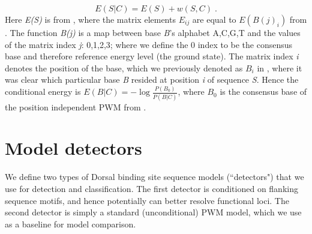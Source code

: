 \begin{equation}\label{cepwm}
  E(S|C) = E(S) + w(S,C)\;.
  \end{equation}
  Here \textit{E(S)} is from , where the matrix elements $E_{ij}$ are equal to $E(B(j)_i)$ from .  The function \textit{B(j)} is a map between base \textit{B}'s alphabet A,C,G,T and the values of the matrix index \textit{j}: 0,1,2,3; where we define the 0 index to be the consensus base and therefore reference energy level (the ground state).  The matrix index \textit{i} denotes the position of the base, which we previously denoted as $B_i$ in , where it was clear which particular base \textit{B} resided at position \textit{i} of sequence \textit{S}.  Hence the conditional energy is $E(B|C)=-\log{\frac{P(B_0)}{P(B|C)}}$, where $B_0$ is the consensus base of the position independent PWM from .

\section{Model detectors}

 We define two types of Dorsal binding site sequence models (``detectors") that we use for detection and classification.  The first detector is conditioned on flanking sequence motifs, and hence potentially can better resolve functional loci.  The second detector is simply a standard (unconditional) PWM model, which we use as a baseline for model comparison.  
  
